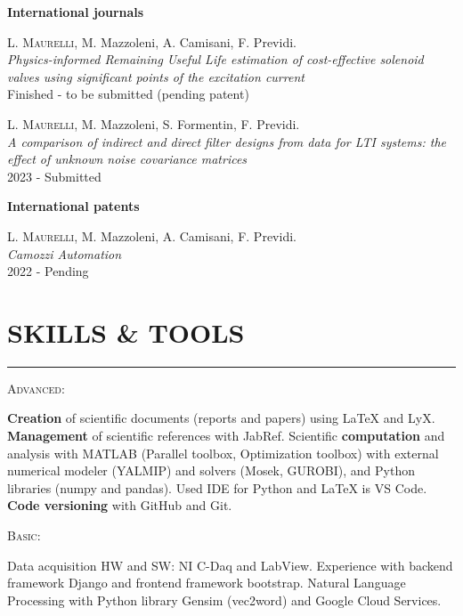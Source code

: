 \documentclass[10pt]{article}
\newcommand{\cvsection}[1]{\section*{\centering\normalsize\uppercase{#1}}\vspace{-16pt}\rule{\linewidth}{0.2pt}\vspace{6pt}}
\begin{document}
\textbf{International journals}
\begin{enumerate}[label={[J0{\arabic*}]}]
	\setlength\itemsep{-3pt}
	\item \label{j2022}\textsc{L. Maurelli}, M. Mazzoleni, A. Camisani, F. Previdi.\\
	\textit{Physics-informed Remaining Useful Life estimation of cost-effective solenoid
	valves using significant points of the excitation current}\\
	Finished - to be submitted (pending patent)
	\item \label{j02}\textsc{L. Maurelli}, M. Mazzoleni, S. Formentin, F. Previdi.\\
	\textit{A comparison of indirect and direct filter designs from data for LTI systems: the effect of unknown noise covariance matrices}\\
	2023 - Submitted
\end{enumerate}
\textbf{International patents}
\begin{enumerate}[label={[P0{\arabic*}]}]
	\setlength\itemsep{-3pt}
	\item \label{p2022}\textsc{L. Maurelli}, M. Mazzoleni, A. Camisani, F. Previdi.\\
	\textit{Camozzi Automation}\\
	2022 - Pending
\end{enumerate}
\clearpage

\cvsection{Skills \& Tools}
{\textsc{Advanced:}\par}
\textbf{Creation} of scientific documents (reports and papers) using LaTeX and LyX. \textbf{Management} of scientific references with JabRef.
Scientific \textbf{computation} and analysis with MATLAB (Parallel toolbox, Optimization toolbox) with external numerical modeler (YALMIP) and solvers (Mosek, GUROBI), and Python libraries (numpy and pandas).
Used IDE for Python and LaTeX is VS Code. \textbf{Code versioning} with GitHub and Git.

{\textsc{Basic:}\par}
Data acquisition HW and SW: NI C-Daq and LabView. Experience with backend framework Django and frontend framework bootstrap. Natural Language Processing with Python library Gensim (vec2word) and Google Cloud Services.
\end{document}

